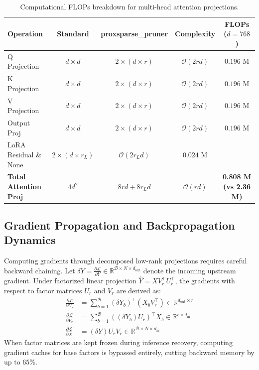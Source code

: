 \begin{table}[H]
\centering
\small
\begin{tabularx}{\linewidth}{lcccc}
\toprule
\textbf{Operation} & \textbf{Standard} & \textbf{proxsparse\_pruner} & \textbf{Complexity} & \textbf{FLOPs ($d=768$)} \\
\midrule
Q Projection & $d \times d$ & $2 \times (d \times r)$ & $\mathcal{O}(2rd)$ & $0.196$ M \\
K Projection & $d \times d$ & $2 \times (d \times r)$ & $\mathcal{O}(2rd)$ & $0.196$ M \\
V Projection & $d \times d$ & $2 \times (d \times r)$ & $\mathcal{O}(2rd)$ & $0.196$ M \\
Output Proj & $d \times d$ & $2 \times (d \times r)$ & $\mathcal{O}(2rd)$ & $0.196$ M \\
LoRA Residual \& None & $2 \times (d \times r_L)$ & $\mathcal{O}(2r_L d)$ & $0.024$ M \\
\midrule
\textbf{Total Attention Proj} & $4 d^2$ & $8rd + 8r_L d$ & $\mathcal{O}(rd)$ & \textbf{0.808 M (vs 2.36 M)} \\
\bottomrule
\end{tabularx}
\caption{Computational FLOPs breakdown for multi-head attention projections.}
\end{table}

\subsection{Gradient Propagation and Backpropagation Dynamics}
Computing gradients through decomposed low-rank projections requires careful backward chaining. Let $\delta Y = \frac{\partial \mathcal{L}}{\partial Y} \in \mathbb{R}^{\mathcal{B} \times N \times d_{\text{out}}}$ denote the incoming upstream gradient. Under factorized linear projection $\hat{Y} = X V_r^\top U_r^\top$, the gradients with respect to factor matrices $U_r$ and $V_r$ are derived as:
\begin{align}
\frac{\partial \mathcal{L}}{\partial U_r} &= \sum_{b=1}^{\mathcal{B}} (\delta Y_b)^\top (X_b V_r^\top) \in \mathbb{R}^{d_{\text{out}} \times r} \\
\frac{\partial \mathcal{L}}{\partial V_r} &= \sum_{b=1}^{\mathcal{B}} ((\delta Y_b) U_r)^\top X_b \in \mathbb{R}^{r \times d_{\text{in}}} \\
\frac{\partial \mathcal{L}}{\partial X} &= (\delta Y) U_r V_r \in \mathbb{R}^{\mathcal{B} \times N \times d_{\text{in}}}
\end{align}
When factor matrices are kept frozen during inference recovery, computing gradient caches for base factors is bypassed entirely, cutting backward memory by up to $65\%$.

